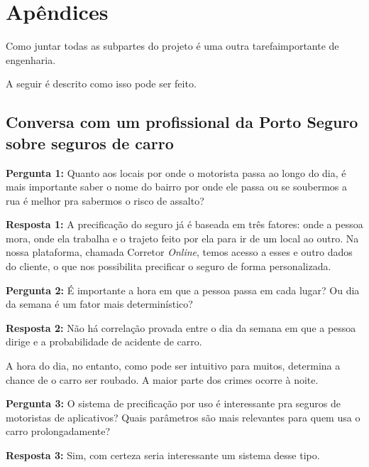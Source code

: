 \chapter{Apêndices}

Como juntar todas as subpartes do projeto é uma outra tarefaimportante de engenharia.

A seguir é descrito como isso pode ser feito.


\section{Conversa com um profissional da Porto Seguro sobre seguros de carro}


\textbf{Pergunta 1:} 
Quanto aos locais por onde o motorista passa ao longo do dia, é mais importante saber o nome do bairro por onde ele passa ou se soubermos a rua é melhor pra sabermos o risco de assalto?

\textbf{Resposta 1:} 
A precificação do seguro já é baseada em três fatores: onde a pessoa mora, onde ela trabalha e o trajeto feito por ela para ir de um local ao outro.
Na nossa plataforma, chamada Corretor \textit{Online}, temos acesso a esses e outro dados do cliente, o que nos possibilita precificar o seguro de forma personalizada.


\textbf{Pergunta 2:} 
É importante a hora em que a pessoa passa em cada lugar? Ou dia da semana é um fator mais determinístico?

\textbf{Resposta 2:}
Não há correlação provada entre o dia da semana em que a pessoa dirige e a probabilidade de acidente de carro.

A hora do dia, no entanto, como pode ser intuitivo para muitos, determina a chance de o carro ser roubado. A maior parte dos crimes ocorre à noite.





\textbf{Pergunta 3:} O sistema de precificação por uso é interessante pra seguros de motoristas de aplicativos? Quais parâmetros são mais relevantes para quem usa o carro prolongadamente?

\textbf{Resposta 3:}
Sim, com certeza seria interessante um sistema desse tipo.

